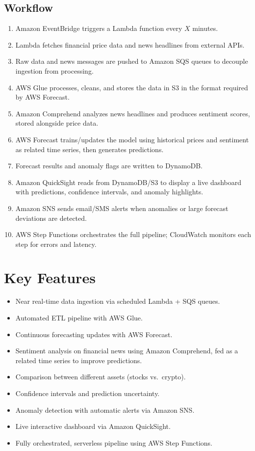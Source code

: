 \documentclass[a4paper,12pt]{article}
\begin{document}
\subsection{Workflow}
\begin{enumerate}[leftmargin=1.4em]
    \item Amazon EventBridge triggers a Lambda function every $X$ minutes.
    \item Lambda fetches financial price data and news headlines from external APIs.
    \item Raw data and news messages are pushed to Amazon SQS queues to decouple ingestion from processing.
    \item AWS Glue processes, cleans, and stores the data in S3 in the format required by AWS Forecast.
    \item Amazon Comprehend analyzes news headlines and produces sentiment scores, stored alongside price data.
    \item AWS Forecast trains/updates the model using historical prices and sentiment as related time series, then generates predictions.
    \item Forecast results and anomaly flags are written to DynamoDB.
    \item Amazon QuickSight reads from DynamoDB/S3 to display a live dashboard with predictions, confidence intervals, and anomaly highlights.
    \item Amazon SNS sends email/SMS alerts when anomalies or large forecast deviations are detected.
    \item AWS Step Functions orchestrates the full pipeline; CloudWatch monitors each step for errors and latency.
\end{enumerate}

\section{Key Features}
\begin{itemize}[leftmargin=1.2em]
    \item Near real-time data ingestion via scheduled Lambda + SQS queues.
    \item Automated ETL pipeline with AWS Glue.
    \item Continuous forecasting updates with AWS Forecast.
    \item Sentiment analysis on financial news using Amazon Comprehend, fed as a related time series to improve predictions.
    \item Comparison between different assets (stocks vs.\ crypto).
    \item Confidence intervals and prediction uncertainty.
    \item Anomaly detection with automatic alerts via Amazon SNS.
    \item Live interactive dashboard via Amazon QuickSight.
    \item Fully orchestrated, serverless pipeline using AWS Step Functions.
\end{itemize}
\end{document}
